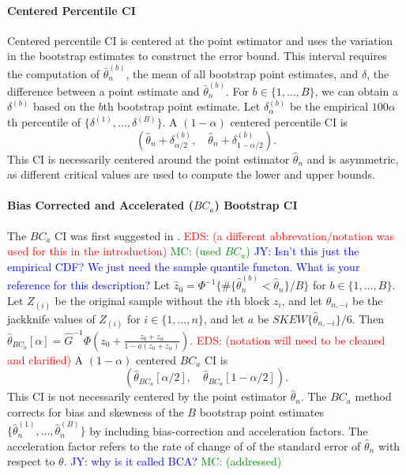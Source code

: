 \documentclass[12pt, letterpaper, titlepage]{article}
\newcommand{\jy}[1]{\textcolor{blue}{JY: #1}}
\newcommand{\eds}[1]{\textcolor{red}{EDS: (#1)}}
\newcommand{\mc}[1]{\textcolor{green}{MC: (#1)}}
\begin{document}
\paragraph{Centered Percentile CI}
Centered percentile CI is centered at the point estimator and uses the
variation
in the bootstrap estimates to construct the error bound. This interval requires
the computation of $\bar\theta_n^{(b)}$, the mean of all bootstrap point
estimates, and $\delta$, the difference between a point estimate and
$\bar\theta_n^{(b)}$. For $b \in \{1, \ldots, B\}$, we can obtain a
$\delta^{(b)}$ based on the $b$th bootstrap point estimate. Let
$\delta_{\alpha}^{(b)}$ be the empirical $100\alpha$th percentile of
$\{\delta^{(1)}, \ldots,  \delta^{(B)}\}$.  
A $(1 - \alpha)$ centered percentile CI is
\[
(\hat{\theta}_{n} + \delta^{(b)}_{\alpha/2}, \quad
\hat{\theta}_{n} + \delta^{(b)}_{1 - \alpha/2}).
\]
This CI is necessarily centered around the point estimator $\hat\theta_n$ and
is asymmetric, as different critical values are used to compute
the lower and upper bounds.


\paragraph{Bias Corrected and Accelerated ($BC_a$) Bootstrap CI}
The $BC_a$ CI was first suggested in \citet{efron1987better}.
\eds{a different abbrevation/notation was used for this in the introduction}
\mc{used $BC_a$}
\jy{Isn't this just the empirical CDF? We just need the sample quantile functon.
  What is your reference for this description?}
Let $\hat{z}_0 = \Phi^{-1}\{\#\{\hat\theta_n^{(b)} < \hat{\theta}_n\} / B\}$
for $b \in \{1, \ldots, B\}$. 
Let $Z_{(i)}$ be the original sample without the $i$th block $z_i$, and let
$\hat{\theta}_{n, -i}$ be the jackknife values of $Z_{(i)}$
for $i \in \{1, \ldots, n\}$, 
and let $a$ be $SKEW\{\hat{\theta}_{n, -i}\} / 6$. Then
$\hat\theta_{BC_a}[\alpha] = \hat{G}^{-1}\Phi(z_0 + \frac{z_{0} +
  z_{\alpha}}{1 - a(z_{0} + z_{\alpha})}).$
\eds{notation will need to be cleaned and clarified}
A $(1 - \alpha)$ centered $BC_a$ CI is
\[
(\hat\theta_{BC_a}[\alpha/2], \quad
\hat\theta_{BC_a}[1 - \alpha/2]).
\]
This CI is not necessarily centered by the point estimator $\hat\theta_n$. The
$BC_a$ method corrects for bias and skewness of the $B$ bootstrap point
estimates $\{\hat\theta_n^{(1)}, \ldots, \hat\theta_n^{(B)}\}$ by including
bias-correction and acceleration factors. The acceleration factor refers to
the 
rate of change of of the standard error of $\hat\theta_n$ with respect to
$\theta$.
\jy{why is it called BCA?}
\mc{addressed}
\end{document}
